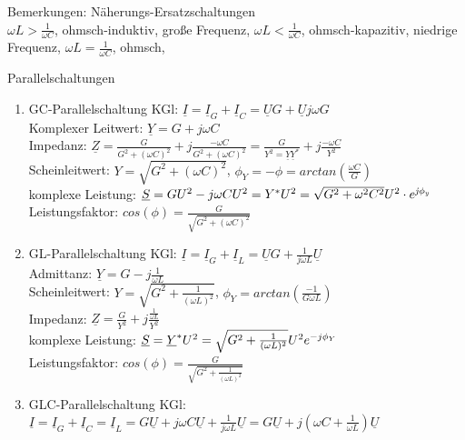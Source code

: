 \documentclass[german]{article}
\begin{document}
Bemerkungen: Näherungs-Ersatzschaltungen \\
$\omega L > \frac1{\omega C}$, ohmsch-induktiv, große Frequenz, %
$\omega L < \frac1{\omega C}$, ohmsch-kapazitiv, niedrige Frequenz, %
$\omega L = \frac1{\omega C}$, ohmsch, %

Parallelschaltungen
\begin{enumerate}
	\item GC-Parallelschaltung 
		KGl: $\underline{I} = \underline{I}_G + \underline{I}_C = \underline{U} G + \underline{U} j \omega G$ \\
		Komplexer Leitwert: $\underline{Y} = G + j \omega C$ \\
		Impedanz: $\underline{Z} = \frac{G}{G^2 + ( \omega C )^2} + j \frac{- \omega C}{G^2 + (\omega C)^2} = \frac{G}{Y^2 = \underline{Y}\underline{Y}^*} + j \frac{- \omega C}{Y^2}$ \\
		Scheinleitwert: $Y = \sqrt{G^2 + (\omega C)^2}$, $\phi_Y = - \phi = arctan\left( \frac{\omega C}{G} \right)$ \\
		komplexe Leistung: $\underline{S} = GU^2 - j\omega C U^2 = Y^{\it *} U^2 = \sqrt{G^2 + \omega^2 C^2} U^2 \cdot e^{\it j\phi_y}$ %
		Leistungsfaktor: $cos(\phi) = \frac{G}{\sqrt{G^2 + (\omega C)^2}}$
	\item GL-Parallelschaltung
		KGl: $\underline{I} = \underline{I}_G + \underline{I}_L = \underline{U}G + \frac1{j\omega L} \underline{U}$ \\
		Admittanz: $\underline{Y} = G - j \frac1{\omega L}$ \\
		Scheinleitwert: $Y = \sqrt{G^2 + \frac1{(\omega L)^2}}$, $\phi_Y = arctan\left( \frac{-1}{G\omega L} \right)$ \\
		Impedanz: $\underline{Z} = \frac{G}{Y^2} + j \frac{\frac1{\omega L}}{Y^2}$ \\
		komplexe Leistung: $\underline{S} = \underline{Y}^{\it *} U^2 = \sqrt{G^2 + \frac1{(\omega L)^2}} U^2 e^{{\it -}j\phi_Y}$ \\
		Leistungsfaktor: $cos(\phi) = \frac{G}{\sqrt{G^2 + \frac1{(\omega L)^2}}}$
	\item GLC-Parallelschaltung
		KGl: $\underline{I} = \underline{I}_G + \underline{I}_C = \underline{I}_L = G \underline{U} + j \omega C \underline{U} + \frac1{j \omega L} \underline{U} = G\underline{U} + j \left(\omega C + \frac1{\omega L}\right)\underline{U}$ \\

\end{enumerate}
\end{document}
